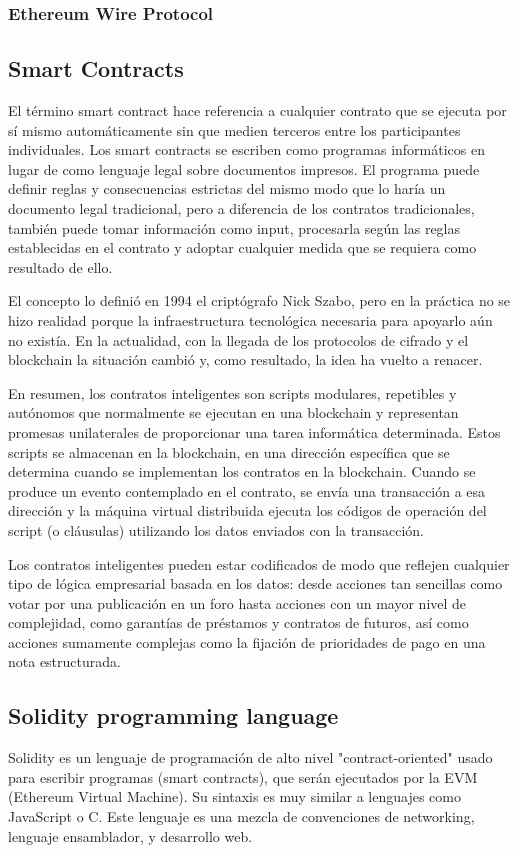 \subsubsection{Ethereum Wire Protocol}

\subsection{Smart Contracts}
El término smart contract hace referencia a cualquier contrato que se ejecuta por sí mismo
automáticamente sin que medien terceros entre los participantes individuales. Los smart contracts
se escriben como programas informáticos en lugar de como lenguaje legal sobre documentos impresos.
El programa puede definir reglas y consecuencias estrictas del mismo modo que lo haría un documento
legal tradicional, pero a diferencia de los contratos tradicionales, también puede tomar
información como input, procesarla según las reglas establecidas en el contrato y adoptar cualquier
medida que se requiera como resultado de ello.

El concepto lo definió en 1994 el criptógrafo Nick Szabo, pero en la práctica no se hizo realidad
porque la infraestructura tecnológica necesaria para apoyarlo aún no existía. En la actualidad, con
la llegada de los protocolos de cifrado y el blockchain la situación cambió y, como resultado, la
idea ha vuelto a renacer.

En resumen, los contratos inteligentes son scripts modulares, repetibles y autónomos que
normalmente se ejecutan en una blockchain y representan promesas unilaterales de proporcionar una
tarea informática determinada. Estos scripts se almacenan en la blockchain, en una dirección
específica que se determina cuando se implementan los contratos en la blockchain. Cuando se produce
un evento contemplado en el contrato, se envía una transacción a esa dirección y la máquina virtual
distribuida ejecuta los códigos de operación del script (o cláusulas) utilizando los datos enviados
con la transacción.

Los contratos inteligentes pueden estar codificados de modo que reflejen cualquier tipo de lógica
empresarial basada en los datos: desde acciones tan sencillas como votar por una publicación en un
foro hasta acciones con un mayor nivel de complejidad, como garantías de préstamos y contratos de
futuros, así como acciones sumamente complejas como la fijación de prioridades de pago en una nota
estructurada.


\subsection{Solidity programming language}
Solidity es un lenguaje de programación de alto nivel "contract-oriented" usado para escribir
programas (smart contracts), que serán ejecutados por la EVM (Ethereum Virtual Machine). Su
sintaxis es muy similar a lenguajes como JavaScript o C.
Este lenguaje es una mezcla de convenciones de networking, lenguaje ensamblador, y desarrollo web.

